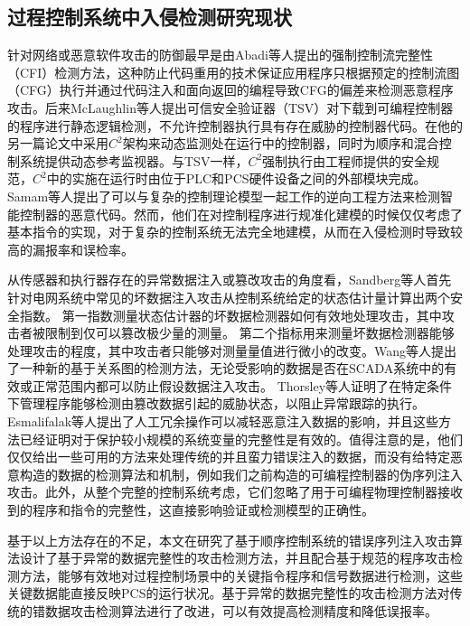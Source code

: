 \subsection{过程控制系统中入侵检测研究现状}

针对网络或恶意软件攻击的防御最早是由Abadi等人提出的强制控制流完整性（CFI）检测方法\parencite{Abadi09}，这种防止代码重用的技术保证应用程序只根据预定的控制流图（CFG）执行并通过代码注入和面向返回的编程导致CFG的偏差来检测恶意程序攻击。后来McLaughlin等人提出可信安全验证器（TSV）\parencite {TSV2014}对下载到可编程控制器的程序进行静态逻辑检测，不允许控制器执行具有存在威胁的控制器代码。在他的另一篇论文中采用$C^2$架构\parencite{McLaughlin13}来动态监测处在运行中的控制器，同时为顺序和混合控制系统提供动态参考监视器。与TSV一样，$C^2$强制执行由工程师提供的安全规范，$C^2$中的实施在运行时由位于PLC和PCS硬件设备之间的外部模块完成。 Samam等人提出了可以与复杂的控制理论模型一起工作的逆向工程方法来检测智能控制器的恶意代码\parencite{Zonouz2014}。然而，他们在对控制程序进行规准化建模的时候仅仅考虑了基本指令的实现，对于复杂的控制系统无法完全地建模，从而在入侵检测时导致较高的漏报率和误检率。

从传感器和执行器存在的异常数据注入或篡改攻击的角度看，Sandberg等人首先针对电网系统中常见的坏数据注入攻击从控制系统给定的状态估计量计算出两个安全指数。 第一指数测量状态估计器的坏数据检测器如何有效地处理攻击，其中攻击者被限制到仅可以篡改极少量的测量\parencite{Sandberg10}。 第二个指标用来测量坏数据检测器能够处理攻击的程度，其中攻击者只能够对测量量值进行微小的改变。Wang等人提出了一种新的基于关系图的检测方法，无论受影响的数据是否在SCADA系统中的有效或正常范围内都可以防止假设数据注入攻击\parencite {wang2014}。 Thorsley等人证明了在特定条件下管理程序能够检测由篡改数据引起的威胁状态，以阻止异常跟踪的执行\parencite {Thorsley2014}。 Esmalifalak等人提出了人工冗余操作可以减轻恶意注入数据的影响，并且这些方法已经证明对于保护较小规模的系统变量的完整性是有效的\parencite{liu2014}。值得注意的是，他们仅仅给出一些可用的方法来处理传统的并且蛮力错误注入的数据，而没有给特定恶意构造的数据的检测算法和机制，例如我们之前构造的可编程控制器的伪序列注入攻击。此外，从整个完整的控制系统考虑，它们忽略了用于可编程物理控制器接收到的程序和指令的完整性，这直接影响验证或检测模型的正确性。

基于以上方法存在的不足，本文在研究了基于顺序控制系统的错误序列注入攻击算法设计了基于异常的数据完整性的攻击检测方法，并且配合基于规范的程序攻击检测方法，能够有效地对过程控制场景中的关键指令程序和信号数据进行检测，这些关键数据能直接反映PCS的运行状况。基于异常的数据完整性的攻击检测方法对传统的错数据攻击检测算法进行了改进，可以有效提高检测精度和降低误报率。

